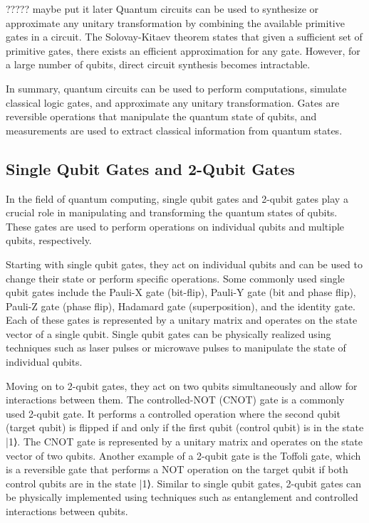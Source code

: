 \documentclass[pra,onecolumn,superscriptaddress]{revtex4}%
\begin{document}
????? maybe put it later
Quantum circuits can be used to synthesize or approximate any unitary transformation by combining the available primitive gates in a circuit. The Solovay-Kitaev theorem states that given a sufficient set of primitive gates, there exists an efficient approximation for any gate. However, for a large number of qubits, direct circuit synthesis becomes intractable.

In summary, quantum circuits can be used to perform computations, simulate classical logic gates, and approximate any unitary transformation. Gates are reversible operations that manipulate the quantum state of qubits, and measurements are used to extract classical information from quantum states.

\subsection{Single Qubit Gates and 2-Qubit Gates}

In the field of quantum computing, single qubit gates and 2-qubit gates play a crucial role in manipulating and transforming the quantum states of qubits. These gates are used to perform operations on individual qubits and multiple qubits, respectively.

Starting with single qubit gates, they act on individual qubits and can be used to change their state or perform specific operations. Some commonly used single qubit gates include the Pauli-X gate (bit-flip), Pauli-Y gate (bit and phase flip), Pauli-Z gate (phase flip), Hadamard gate (superposition), and the identity gate. Each of these gates is represented by a unitary matrix and operates on the state vector of a single qubit. Single qubit gates can be physically realized using techniques such as laser pulses or microwave pulses to manipulate the state of individual qubits.

Moving on to 2-qubit gates, they act on two qubits simultaneously and allow for interactions between them. The controlled-NOT (CNOT) gate is a commonly used 2-qubit gate. It performs a controlled operation where the second qubit (target qubit) is flipped if and only if the first qubit (control qubit) is in the state |1⟩. The CNOT gate is represented by a unitary matrix and operates on the state vector of two qubits. Another example of a 2-qubit gate is the Toffoli gate, which is a reversible gate that performs a NOT operation on the target qubit if both control qubits are in the state |1⟩. Similar to single qubit gates, 2-qubit gates can be physically implemented using techniques such as entanglement and controlled interactions between qubits.
\end{document}
